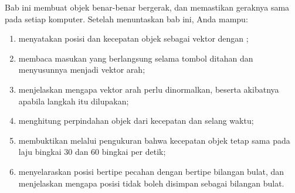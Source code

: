 \begin{tujuanbox}
Bab ini membuat objek benar-benar bergerak, dan memastikan geraknya sama pada
setiap komputer. Setelah menuntaskan bab ini, Anda mampu:
\begin{enumerate}
  \item menyatakan posisi dan kecepatan objek sebagai vektor dengan
        ;
  \item membaca masukan yang berlangsung selama tombol ditahan dan menyusunnya
        menjadi vektor arah;
  \item menjelaskan mengapa vektor arah perlu dinormalkan, beserta akibatnya
        apabila langkah itu dilupakan;
  \item menghitung perpindahan objek dari kecepatan dan selang waktu;
  \item membuktikan melalui pengukuran bahwa kecepatan objek tetap sama pada
        laju bingkai 30 dan 60 bingkai per detik;
  \item menyelaraskan posisi bertipe pecahan dengan  bertipe
        bilangan bulat, dan menjelaskan mengapa posisi tidak boleh disimpan
        sebagai bilangan bulat.
\end{enumerate}
\end{tujuanbox}
